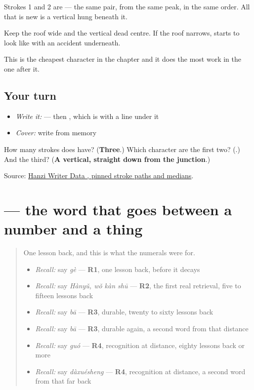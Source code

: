 Strokes 1 and 2 are \textbf{} — the same pair, from the same peak, in the same order. All that is new is a vertical hung beneath it.

Keep the roof wide and the vertical dead centre. If the roof narrows,  starts to look like  with an accident underneath.

This is the cheapest character in the chapter and it does the most work in the one after it.

\subsection*{Your turn}
\begin{itemize}
\raggedright
  \item \emph{Write it:}  — then , which is  with a line under it
  \item \emph{Cover:} write  from memory
\end{itemize}

\begin{tcolorbox}[breakable,colback=teal!4,colframe=teal!35!black,title={Before you move on}]
How many strokes does  have? (\textbf{Three}.) Which character are the first two? (\textbf{}.) And the third? (\textbf{A vertical, straight down from the junction}.)

Source: \href{https://raw.githubusercontent.com/chanind/hanzi-writer-data/68d10a4b21150cae5e1ebbd223eed289cf32d90c/data/\%E4\%B8\%AA.json}{Hanzi Writer Data , pinned stroke paths and medians}.
\end{tcolorbox}
\section[\texorpdfstring{\zh{个} (gè)}{个 (gè)}]{ — the word that goes between a number and a thing}

\label{lesson:ZH-C24-ge}



\begin{quote}
One lesson back, and this is what the numerals were for.

\begin{itemize}
\raggedright
  \item \emph{Recall:} say \emph{gè} — \textbf{R1}, one lesson back, before it decays
  \item \emph{Recall:} say \emph{Hànyǔ, wǒ kàn shū} — \textbf{R2}, the first real retrieval, five to fifteen lessons back
  \item \emph{Recall:} say \emph{bā} — \textbf{R3}, durable, twenty to sixty lessons back
  \item \emph{Recall:} say \emph{bā} — \textbf{R3}, durable again, a second word from that distance
  \item \emph{Recall:} say \emph{guó} — \textbf{R4}, recognition at distance, eighty lessons back or more
  \item \emph{Recall:} say \emph{dàxuésheng} — \textbf{R4}, recognition at distance, a second word from that far back
\end{itemize}
\end{quote}


